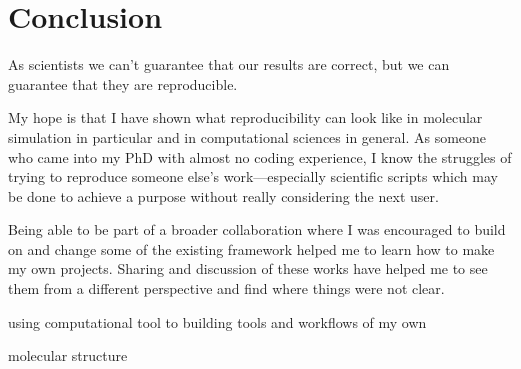 \chapter{Conclusion}
\label{chap:conclusion}

As scientists we can't guarantee that our results are correct, but we can guarantee that they are reproducible.

My hope is that I have shown what reproducibility can look like in molecular simulation in particular and in computational sciences in general.
As someone who came into my PhD with almost no coding experience, I know the struggles of trying to reproduce someone else's work---especially scientific scripts which may be done to achieve a purpose without really considering the next user. 

Being able to be part of a broader collaboration where I was encouraged to build on and change some of the existing framework helped me to learn how to make my own projects.
Sharing and discussion of these works have helped me to see them from a different perspective and find where things were not clear.

using computational tool to building tools and workflows of my own

molecular structure

